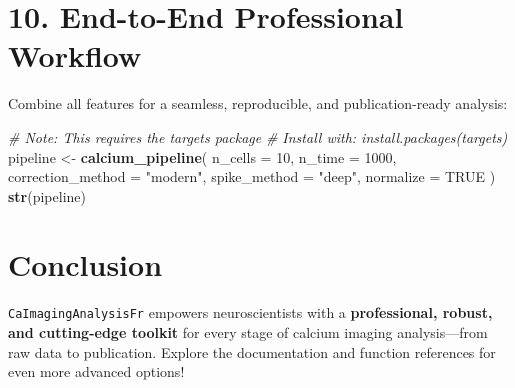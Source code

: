 \documentclass[
]{article}
\newenvironment{Shaded}{\begin{snugshade}}{\end{snugshade}}
\newcommand{\AttributeTok}[1]{\textcolor[rgb]{0.13,0.29,0.53}{#1}}
\newcommand{\CommentTok}[1]{\textcolor[rgb]{0.56,0.35,0.01}{\textit{#1}}}
\newcommand{\ConstantTok}[1]{\textcolor[rgb]{0.56,0.35,0.01}{#1}}
\newcommand{\DecValTok}[1]{\textcolor[rgb]{0.00,0.00,0.81}{#1}}
\newcommand{\FunctionTok}[1]{\textcolor[rgb]{0.13,0.29,0.53}{\textbf{#1}}}
\newcommand{\NormalTok}[1]{#1}
\newcommand{\OtherTok}[1]{\textcolor[rgb]{0.56,0.35,0.01}{#1}}
\newcommand{\StringTok}[1]{\textcolor[rgb]{0.31,0.60,0.02}{#1}}
\begin{document}
\section{10. End-to-End Professional
Workflow}\label{end-to-end-professional-workflow}

Combine all features for a seamless, reproducible, and publication-ready
analysis:

\begin{Shaded}
\begin{Highlighting}[]
\CommentTok{\# Note: This requires the \textquotesingle{}targets\textquotesingle{} package}
\CommentTok{\# Install with: install.packages(\textquotesingle{}targets\textquotesingle{})}
\NormalTok{pipeline }\OtherTok{\textless{}{-}} \FunctionTok{calcium\_pipeline}\NormalTok{(}
  \AttributeTok{n\_cells =} \DecValTok{10}\NormalTok{,}
  \AttributeTok{n\_time =} \DecValTok{1000}\NormalTok{,}
  \AttributeTok{correction\_method =} \StringTok{"modern"}\NormalTok{,}
  \AttributeTok{spike\_method =} \StringTok{"deep"}\NormalTok{,}
  \AttributeTok{normalize =} \ConstantTok{TRUE}
\NormalTok{)}
\FunctionTok{str}\NormalTok{(pipeline)}
\end{Highlighting}
\end{Shaded}

\section{Conclusion}\label{conclusion}

\texttt{CaImagingAnalysisFr} empowers neuroscientists with a
\textbf{professional, robust, and cutting-edge toolkit} for every stage
of calcium imaging analysis---from raw data to publication. Explore the
documentation and function references for even more advanced options!
\end{document}
